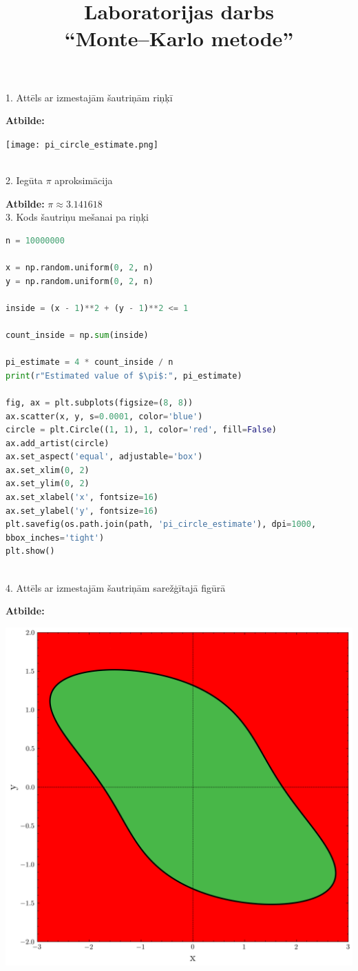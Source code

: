 \documentclass[12pt]{article}
\title{%
  \centering                              %
  Laboratorijas darbs\\[1ex]              %
  \large ``Monte--Karlo metode''}          %
\author{}
\date{}
\begin{document}
 
\maketitle
\vspace*{-6em}

1. Attēls ar izmestajām šautriņām riņķī

\textbf{Atbilde:}

\begin{center}
    \texttt{[image: pi\_circle\_estimate.png]}
\end{center} \\

2. Iegūta $\pi$ aproksimācija

\textbf{Atbilde:} $\pi \approx 3.141618$ \\

3. Kods šautriņu mešanai pa riņķi

\begin{lstlisting}[language=Python]
n = 10000000

x = np.random.uniform(0, 2, n)
y = np.random.uniform(0, 2, n)

inside = (x - 1)**2 + (y - 1)**2 <= 1

count_inside = np.sum(inside)

pi_estimate = 4 * count_inside / n
print(r"Estimated value of $\pi$:", pi_estimate)

fig, ax = plt.subplots(figsize=(8, 8))
ax.scatter(x, y, s=0.0001, color='blue')
circle = plt.Circle((1, 1), 1, color='red', fill=False)
ax.add_artist(circle)
ax.set_aspect('equal', adjustable='box')
ax.set_xlim(0, 2)
ax.set_ylim(0, 2)
ax.set_xlabel('x', fontsize=16)
ax.set_ylabel('y', fontsize=16)
plt.savefig(os.path.join(path, 'pi_circle_estimate'), dpi=1000, 
bbox_inches='tight')
plt.show()
\end{lstlisting}\\

4. Attēls ar izmestajām šautriņām sarežģītajā figūrā

\textbf{Atbilde:} 

\begin{center}
    \includegraphics[width=0.8\linewidth]{monte_carlo_area_estimate.png}
\end{center}
\\
\end{document}
